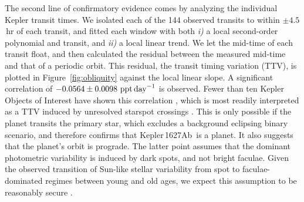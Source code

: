 \documentclass[12pt,modern,twocolumn,tighten]{aastex63}
\newcommand{\pn}{Kepler\,1627Ab} %
\begin{document}

The second line of confirmatory evidence comes by analyzing the
individual Kepler transit times. We isolated each of the 144 observed
transits to within $\pm4.5$\,hr of each transit, and fitted each
window with both {\it i)} a local second-order polynomial and transit,
and {\it ii)} a local linear trend.  We let the mid-time of each
transit float, and then calculated the residual between the measured
mid-time and that of a periodic orbit.  This residual, the transit
timing variation (TTV), is plotted in Figure~\ref{fig:obliquity}
against the local linear slope.  A significant correlation of $-0.0564
\pm 0.0098\ {\rm ppt\,day}^{-1}$ is observed.  Fewer than ten Kepler
Objects of Interest have shown this correlation
\citep{holczer_time_2015}, which is most readily interpreted as a TTV
induced by unresolved starspot crossings \citep{mazeh_time_2015}.
This is only possible if the planet transits the primary star, which
excludes a background eclipsing binary scenario, and therefore
confirms that \pn\ is a planet.  It also suggests that the planet's
orbit is prograde.  The latter point assumes that the dominant
photometric variability is induced by dark spots, and not bright
faculae.  Given the observed transition of Sun-like stellar
variability from spot to faculae-dominated regimes between young and
old ages, we expect this assumption to be reasonably secure
\citep{shapiro_are_2016,montet_long-term_2017,reinhold_stellar_2020}.
\end{document}
